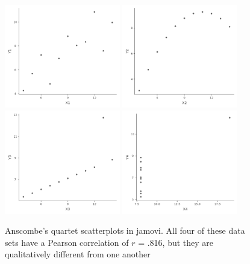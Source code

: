 \documentclass[
  a4paper,
]{book}
\begin{document}
\begin{figure}

\begin{minipage}[t]{\linewidth}

{\centering 

\includegraphics[width=0.45\textwidth,height=\textheight]{images/fig12-6a.png}
\includegraphics[width=0.45\textwidth,height=\textheight]{images/fig12-6b.png}
\includegraphics[width=0.45\textwidth,height=\textheight]{images/fig12-6c.png}
\includegraphics[width=0.45\textwidth,height=\textheight]{images/fig12-6d.png}

}

\end{minipage}%

\caption{\label{fig-fig12-6}Anscombe's quartet scatterplots in jamovi.
All four of these data sets have a Pearson correlation of \(r\) = .816,
but they are qualitatively different from one another}

\end{figure}
\end{document}
